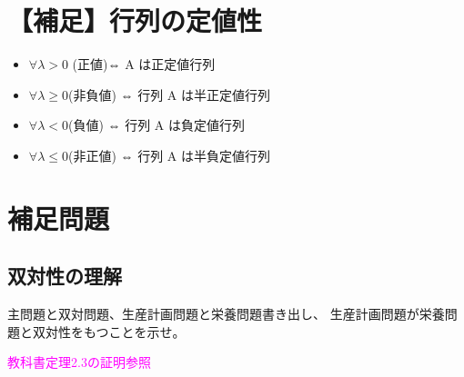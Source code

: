 \documentclass[twocolumn]{ltjsarticle}
\newcommand{\ans}[1]{
    \begin{tcolorbox}[\visible]
        \textcolor{magenta}{#1}
    \end{tcolorbox}
}
\begin{document}
\section{【補足】行列の定値性}
\begin{itemize}
    \item $\forall \lambda  > 0$ (正値)⇔ A は正定値行列
    \item $\forall \lambda  \geq 0$(非負値) ⇔ 行列 A は半正定値行列
    \item $\forall \lambda < 0$(負値) ⇔ 行列 A は負定値行列
    \item $\forall \lambda \leq 0$(非正値) ⇔ 行列 A は半負定値行列
\end{itemize}

\section{補足問題}
\subsection{双対性の理解}
主問題と双対問題、生産計画問題と栄養問題書き出し、
生産計画問題が栄養問題と双対性をもつことを示せ。
\ans{
    教科書定理2.3の証明参照
}
\end{document}
